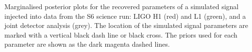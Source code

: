 \label{fig:s6sw_inj}
Marginalised posterior plots for the recovered parameters of a simulated signal injected into data from the S6
science run: LIGO H1 (red) and L1 (green), and a joint detector analysis (grey). The location of the simulated
signal parameters are marked with a vertical black dash line or black cross. The priors used for each
parameter are shown as the dark magenta dashed lines.
